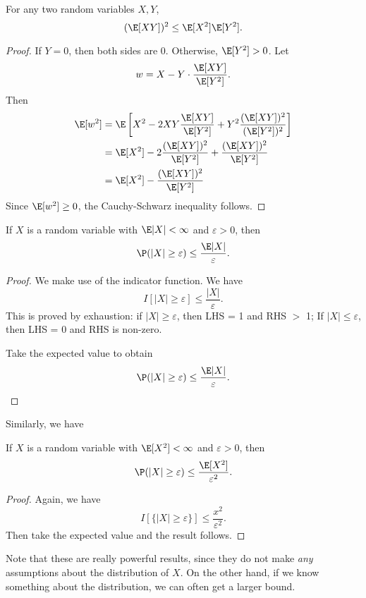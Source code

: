 \documentclass[a4paper]{article}
\begin{document}
\begin{thm}
  For any two random variables $X, Y$,
  \[
    (\E[XY])^2 \leq \E[X^2]\E[Y^2].
  \]
\end{thm}

\begin{proof}
  If $Y = 0$, then both sides are $0$. Otherwise, $\E[Y^2] > 0$. Let
  \[
    w = X - Y\cdot \frac{\E[XY]}{\E[Y^2]}.
  \]
  Then
  \begin{align*}
    \E[w^2] &= \E\left[X^2 - 2XY\frac{\E[XY]}{\E[Y^2]} + Y^2\frac{(\E[XY])^2}{(\E[Y^2])^2}\right]\\
    &= \E[X^2] - 2\frac{(\E[XY])^2}{\E[Y^2]} + \frac{(\E[XY])^2}{\E[Y^2]}\\
    &= \E[X^2] - \frac{(\E[XY])^2}{\E[Y^2]}
  \end{align*}
  Since $\E[w^2] \geq 0$, the Cauchy-Schwarz inequality follows.
\end{proof}

\begin{thm}
  If $X$ is a random variable with $\E|X| < \infty$ and $\varepsilon > 0$, then
  \[
    \P(|X| \geq \varepsilon) \leq \frac{\E|X|}{\varepsilon}.
  \]
\end{thm}

\begin{proof}
  We make use of the indicator function. We have
  \[
    I[|X|\geq \varepsilon] \leq \frac{|X|}{\varepsilon}.
  \]
  This is proved by exhaustion: if $|X| \geq \varepsilon$, then LHS = 1 and RHS $>$ 1; If $|X| \leq \varepsilon$, then LHS = 0 and RHS is non-zero.

  Take the expected value to obtain
  \[
    \P(|X| \geq \varepsilon) \leq \frac{\E |X|}{\varepsilon}.
  \]
\end{proof}

Similarly, we have
\begin{thm}
  If $X$ is a random variable with $\E[X^2] < \infty$ and $\varepsilon > 0$, then
  \[
    \P(|X| \geq \varepsilon) \leq \frac{\E[X^2]}{\varepsilon^2}.
  \]
\end{thm}

\begin{proof}
  Again, we have
  \[
    I[\{|X|\geq \varepsilon\}] \leq \frac{x^2}{\varepsilon^2}.
  \]
  Then take the expected value and the result follows.
\end{proof}
Note that these are really powerful results, since they do not make \emph{any} assumptions about the distribution of $X$. On the other hand, if we know something about the distribution, we can often get a larger bound.
\end{document}
